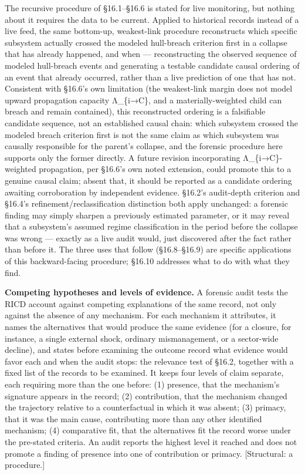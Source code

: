 \documentclass[
]{article}
\begin{document}
The recursive procedure of §16.1--§16.6 is stated for live monitoring,
but nothing about it requires the data to be current. Applied to
historical records instead of a live feed, the same bottom-up,
weakest-link procedure reconstructs which specific subsystem actually
crossed the modeled hull-breach criterion first in a collapse that has
already happened, and when --- reconstructing the observed sequence of
modeled hull-breach events and generating a testable candidate causal
ordering of an event that already occurred, rather than a live
prediction of one that has not. Consistent with §16.6's own limitation
(the weakest-link margin does not model upward propagation capacity
Λ\_\{i→C\}, and a materially-weighted child can breach and remain
contained), this reconstructed ordering is a falsifiable candidate
sequence, not an established causal chain: which subsystem crossed the
modeled breach criterion first is not the same claim as which subsystem
was causally responsible for the parent's collapse, and the forensic
procedure here supports only the former directly. A future revision
incorporating Λ\_\{i→C\}-weighted propagation, per §16.6's own noted
extension, could promote this to a genuine causal claim; absent that, it
should be reported as a candidate ordering awaiting corroboration by
independent evidence. §16.2's audit-depth criterion and §16.4's
refinement/reclassification distinction both apply unchanged: a forensic
finding may simply sharpen a previously estimated parameter, or it may
reveal that a subsystem's assumed regime classification in the period
before the collapse was wrong --- exactly as a live audit would, just
discovered after the fact rather than before it. The three uses that
follow (§16.8--§16.9) are specific applications of this backward-facing
procedure; §16.10 addresses what to do with what they find.

\textbf{Competing hypotheses and levels of evidence.} A forensic audit
tests the RICD account against competing explanations of the same
record, not only against the absence of any mechanism. For each
mechanism it attributes, it names the alternatives that would produce
the same evidence (for a closure, for instance, a single external shock,
ordinary mismanagement, or a sector-wide decline), and states before
examining the outcome record what evidence would favor each and when the
audit stops: the relevance test of §16.2, together with a fixed list of
the records to be examined. It keeps four levels of claim separate, each
requiring more than the one before: (1) presence, that the mechanism's
signature appears in the record; (2) contribution, that the mechanism
changed the trajectory relative to a counterfactual in which it was
absent; (3) primacy, that it was the main cause, contributing more than
any other identified mechanism; (4) comparative fit, that the
alternatives fit the record worse under the pre-stated criteria. An
audit reports the highest level it reached and does not promote a
finding of presence into one of contribution or primacy. {[}Structural:
a procedure.{]}
\end{document}
